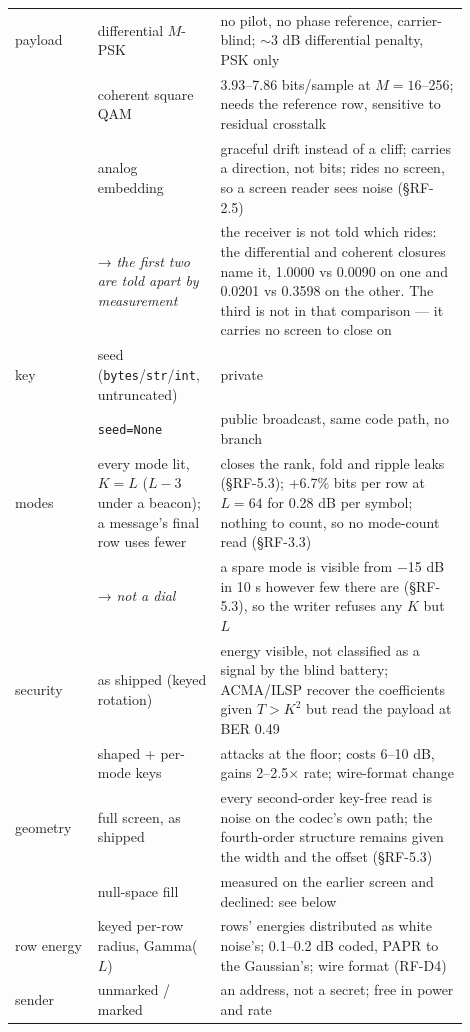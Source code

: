 \documentclass[10pt,letterpaper,twocolumn]{article}
\begin{document}
\begin{center}
{\footnotesize
{}
\tabletail{\midrule}
\tablelasttail{\bottomrule}
\begin{xtabular}{L{0.171\linewidth}L{0.207\linewidth}L{0.519\linewidth}}
payload & differential \(M\)-PSK & no pilot, no phase reference, carrier-blind; \(\sim\)3 dB differential
penalty, PSK only \\
 & coherent square QAM & 3.93--7.86 bits/sample at \(M{=}16\)--256; needs the reference row,
sensitive to residual crosstalk \\
 & analog embedding & graceful drift instead of a cliff; carries a direction, not bits; rides
no screen, so a screen reader sees noise (§RF-2.5) \\
 & → \emph{the first two are told apart by measurement} & the receiver is not told which rides: the differential and coherent
closures name it, 1.0000 vs 0.0090 on one and 0.0201 vs 0.3598 on the
other. The third is not in that comparison --- it carries no screen to
close on \\
key & seed (\texttt{bytes}/\texttt{str}/\texttt{int}, untruncated) & private \\
 & \texttt{seed=\allowbreak{}None} & public broadcast, same code path, no branch \\
modes & every mode lit, \(K = L\) (\(L - 3\) under a beacon); a message's final
row uses fewer & closes the rank, fold and ripple leaks (§RF-5.3); +6.7\% bits per row at
\(L = 64\) for 0.28 dB per symbol; nothing to count, so no mode-count
read (§RF-3.3) \\
 & → \emph{not a dial} & a spare mode is visible from −15 dB in 10 s however few there are
(§RF-5.3), so the writer refuses any \(K\) but \(L\) \\
security & as shipped (keyed rotation) & energy visible, not classified as a signal by the blind battery;
ACMA/ILSP recover the coefficients given \(T > K^2\) but read the
payload at BER 0.49 \\
 & shaped + per-mode keys & attacks at the floor; costs 6--10 dB, gains 2--2.5× rate; wire-format
change \\
geometry & full screen, as shipped & every second-order key-free read is noise on the codec's own path; the
fourth-order structure remains given the width and the offset (§RF-5.3) \\
 & null-space fill & measured on the earlier screen and declined: see below \\
row energy & keyed per-row radius, Gamma(\(L\)) & rows' energies distributed as white noise's; 0.1--0.2 dB coded, PAPR to
the Gaussian's; wire format (RF-D4) \\
sender & unmarked / marked & an address, not a secret; free in power and rate \\
\end{xtabular}
}
\end{center}
\end{document}
